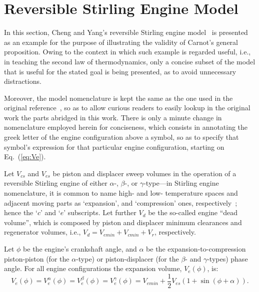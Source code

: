 \section{Reversible Stirling Engine Model}

    In     this     section,     Cheng     and     Yang's     reversible     Stirling     engine
    model~\cite{2012-ChengCH+YangHS-ApEnergy} is presented as an  example  for  the  purpose  of
    illustrating the validity of Carnot's general proposition. Owing to  the  context  in  which
    such example is regarded useful, i.e., in teaching the second law of thermodynamics, only  a
    concise subset of the model that is useful for the stated goal is  being  presented,  as  to
    avoid unnecessary distractions.

    Moreover, the model nomenclature  is  kept  the  same  as  the  one  used  in  the  original
    reference~\cite{2012-ChengCH+YangHS-ApEnergy}, so as to  allow  curious  readers  to  easily
    lookup in the original work the parts abridged in this work. There is only a  minute  change
    in nomenclature employed herein for conciseness, which  consists  in  annotating  the  greek
    letter of the engine configuration above a symbol, so as to specify that symbol's expression
    for that particular engine configuration, starting on Eq.~(\ref{eq:Ve}).

    Let $V_{cs}$ and $V_{es}$ be piston and displacer  sweep  volumes  in  the  operation  of  a
    reversible Stirling engine of either $\alpha$-,  $\beta$-,  or  $\gamma$-type---in  Stirling
    engine nomenclature, it is common to name high- and low-  temperature  spaces  and  adjacent
    moving       parts       as        `expansion',        and        `compression'        ones,
    respectively~\cite{2013-CengelYA+BolesMA-AMGH}; hence the `$c$' and  `$e$'  subscripts.  Let
    further $V_d$ be the so-called engine ``dead volume'',  which  is  composed  by  piston  and
    displacer minimum clearances and regenerator volumes, i.e., $V_d =  V_{emin}  +  V_{cmin}  +
    V_r$, respectively.

    Let $\phi$ be the engine's crankshaft angle, and $\alpha$  be  the  expansion-to-compression
    piston-piston  (for  the  $\alpha$-type)  or  piston-displacer   (for   the   $\beta$-   and
    $\gamma$-types)  phase  angle.  For  all  engine  configurations   the   expansion   volume,
    $V_e(\phi)$, is:
    \begin{equation}
        \label{eq:Ve}
        V_e(\phi) = V^{\alpha}_e(\phi) = V^{\beta}_e(\phi) = V^{\gamma}_e(\phi) = V_{emin} + \frac{1}{2} V_{es}(1 + \sin(\phi + \alpha)).
    \end{equation}

